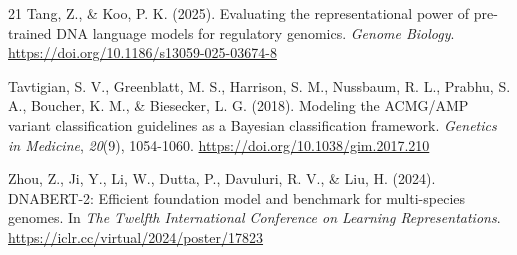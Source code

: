 \begin{thebibliography}{21}
Tang, Z., \& Koo, P. K. (2025). Evaluating the representational power of pre-trained DNA language models for regulatory genomics. \textit{Genome Biology}. \url{https://doi.org/10.1186/s13059-025-03674-8}

Tavtigian, S. V., Greenblatt, M. S., Harrison, S. M., Nussbaum, R. L., Prabhu, S. A., Boucher, K. M., \& Biesecker, L. G. (2018). Modeling the ACMG/AMP variant classification guidelines as a Bayesian classification framework. \textit{Genetics in Medicine}, \textit{20}(9), 1054-1060. \url{https://doi.org/10.1038/gim.2017.210}

Zhou, Z., Ji, Y., Li, W., Dutta, P., Davuluri, R. V., \& Liu, H. (2024). DNABERT-2: Efficient foundation model and benchmark for multi-species genomes. In \textit{The Twelfth International Conference on Learning Representations}. \url{https://iclr.cc/virtual/2024/poster/17823}

\end{thebibliography}
